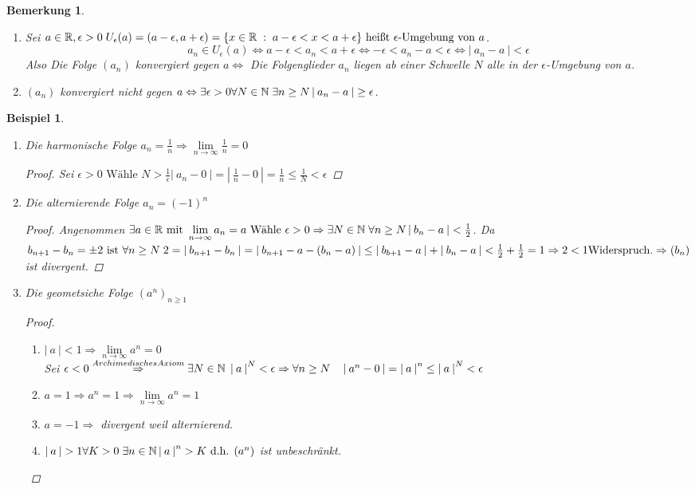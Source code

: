 \documentclass[a4paper,titlepage,oneside]{article}
\def\N{\ensuremath{\mathbb{N}} }
\def\R{\ensuremath{\mathbb{R}} }
\def\WSP{\text{Widerspruch.}}
\def\sp{\hspace{0,1cm}}
\renewcommand{\liminf}[2][n]{\ensuremath{\lim\limits_{#1 \rightarrow \infty}{#2}}}
\newcommand{\abs}[1]{\ensuremath{\left|\:#1\:\right|}}
\newcommand{\menge}[2]{\ensuremath{\{#1\sp : \sp #2\}}}
\theoremstyle{thmstyle}
\newtheorem{bsp}[satz]{Beispiel}
\newtheorem{bem}[satz]{Bemerkung}
\begin{document}
\begin{bem}
\begin{enumerate}
\item Sei \(a \in \R, \epsilon > 0 \sp U_\epsilon(a) = (a-\epsilon, a+\epsilon) = \menge{x \in \R}{a - \epsilon < x < a + \epsilon}\text{ heißt }\epsilon\text{-Umgebung von }a\).
\[ a_n \in U_\epsilon(a) \Leftrightarrow a-\epsilon < a_n < a + \epsilon \Leftrightarrow -\epsilon < a_n - a < \epsilon \Leftrightarrow \abs{a_n - a} < \epsilon\]
Also Die Folge \((a_n)\) konvergiert gegen \(a \Leftrightarrow \) Die Folgenglieder \(a_n\) liegen ab einer Schwelle \(N\) alle in der \(\epsilon\)-Umgebung von \(a\).
\item \((a_n)\) konvergiert nicht gegen \(a \Leftrightarrow \exists \epsilon > 0 \forall N\in\N \sp \exists n \ge N \abs{a_n - a} \ge \epsilon\).
\end{enumerate}
\end{bem}

\begin{bsp}
\begin{enumerate}[label=(\arabic*)]
\item Die harmonische Folge \(a_n = \frac{1}{n} \Rightarrow \liminf{\frac{1}{n}} = 0\)
\begin{proof}
Sei \(\epsilon > 0 \text{ Wähle } N > \frac{1}{\epsilon} \abs{a_n - 0} = \abs{\frac{1}{n} - 0} = \frac{1}{n} \le \frac{1}{N} < \epsilon\)
\end{proof}
\item Die alternierende Folge \(a_n = (-1)^n\)
\begin{proof}
Angenommen \(\exists a \in \R \text{ mit } \liminf{a_n} = a \text{ Wähle } \epsilon > 0 \Rightarrow \exists N \in \N \sp \forall n \ge N \abs{b_n - a} < \frac{1}{2}\).
Da \(b_{n+1} - b_n = \pm 2 \text{ ist } \forall n \ge N \sp 2 = \abs{b_{n+1} - b_{n}} = \abs{b_{n+1} - a - (b_n - a)} \le \abs{b_{b+1} - a} + \abs{b_n - a} < \frac{1}{2} + \frac{1}{2} = 1 \Rightarrow 2 < 1 \WSP \Rightarrow (b_n) \) ist divergent.
\end{proof}
\item Die geometsiche Folge \((a^n)_{n\ge1}\)
\begin{proof}
\begin{enumerate}[label=\arabic*. Fall]
\item \(\abs{a} < 1 \Rightarrow \liminf{a^n} = 0\) \\
Sei \(\epsilon < 0 \overset{Archimedisches Axiom}{\Rightarrow} \exists N \in \N \sp \abs{a}^N < \epsilon \Rightarrow \forall n \ge N \quad \abs{a^n - 0} = \abs{a}^n \le \abs{a}^N < \epsilon\)
\item \(a = 1 \Rightarrow a^n = 1 \Rightarrow \liminf{a^n} = 1\)
\item \(a = -1 \Rightarrow \) divergent weil alternierend.
\item \(\abs{a} > 1 \forall K > 0 \sp \exists n \in \N \abs{a}^n > K \text{ d.h. } (a^n)\) ist unbeschränkt.
\end{enumerate}
\end{proof}
\end{enumerate}
\end{bsp}
\end{document}
